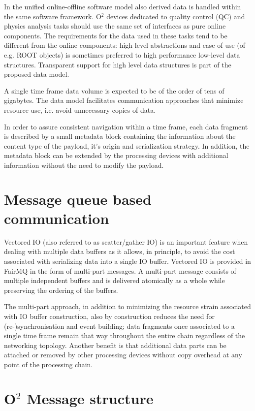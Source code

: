 \documentclass[a4paper,twoside]{article}
\def\O2{O$^2$}
\begin{document}
In the unified online-offline software model also derived data is handled within the same software framework. \O2 devices dedicated to quality control (QC) and physics analysis tasks should use the same set of interfaces as pure online components. The requirements for the data used in these tasks tend to be different from the online components: high level abstractions and ease of use (of e.g. ROOT\cite{root} objects) is sometimes preferred to high performance low-level data structures. Transparent support for high level data structures is part of the proposed data model.

A single time frame data volume is expected to be of the order of tens of gigabytes. The data model facilitates communication approaches that minimize resource use, i.e. avoid unnecessary copies of data.

In order to assure consistent navigation within a time frame, each data fragment is described by a small metadata block containing the information about the content type of the payload, it's origin and serialization strategy.
In addition, the metadata block can be extended by the processing devices with additional information without the need to modify the payload.

\section{Message queue based communication}

Vectored IO (also referred to as scatter/gather IO) is an important feature when dealing with multiple data buffers as it allows, in principle, to avoid the cost associated with serializing data into a single IO buffer.
Vectored IO is provided in FairMQ in the form of multi-part messages. A multi-part message consists of multiple independent buffers and is delivered atomically as a whole while preserving the ordering of the buffers.

The multi-part approach, in addition to minimizing the resource strain associated with IO buffer construction, also by construction reduces the need for (re-)synchronisation and event building; data fragments once associated to a single time frame remain that way throughout the entire chain regardless of the networking topology. Another benefit is that additional data parts can be attached or removed by other processing devices without copy overhead at any point of the processing chain.

\section{\O2 Message structure}
\end{document}
